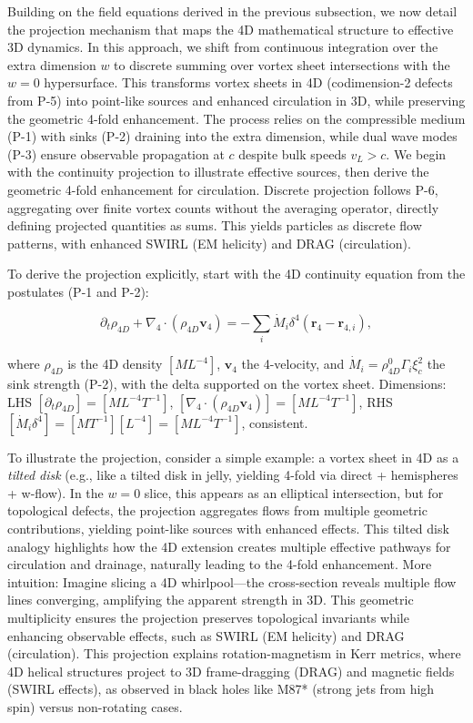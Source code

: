 Building on the field equations derived in the previous subsection, we now detail the projection mechanism that maps the 4D mathematical structure to effective 3D dynamics. In this approach, we shift from continuous integration over the extra dimension $w$ to discrete summing over vortex sheet intersections with the $w=0$ hypersurface. This transforms vortex sheets in 4D (codimension-2 defects from P-5) into point-like sources and enhanced circulation in 3D, while preserving the geometric 4-fold enhancement. The process relies on the compressible medium (P-1) with sinks (P-2) draining into the extra dimension, while dual wave modes (P-3) ensure observable propagation at $c$ despite bulk speeds $v_L > c$. We begin with the continuity projection to illustrate effective sources, then derive the geometric 4-fold enhancement for circulation. Discrete projection follows P-6, aggregating over finite vortex counts without the averaging operator, directly defining projected quantities as sums. This yields particles as discrete flow patterns, with enhanced SWIRL (EM helicity) and DRAG (circulation).

To derive the projection explicitly, start with the 4D continuity equation from the postulates (P-1 and P-2):

\begin{equation}
\partial_t \rho_{4D} + \nabla_4 \cdot (\rho_{4D} \mathbf{v}_4) = -\sum_i \dot{M}_i \delta^4(\mathbf{r}_4 - \mathbf{r}_{4,i}),
\end{equation}

where $\rho_{4D}$ is the 4D density $[M L^{-4}]$, $\mathbf{v}_4$ the 4-velocity, and $\dot{M}_i = \rho_{4D}^0 \Gamma_i \xi_c^2$ the sink strength (P-2), with the delta supported on the vortex sheet. Dimensions: LHS $[\partial_t \rho_{4D}] = [M L^{-4} T^{-1}]$, $[\nabla_4 \cdot (\rho_{4D} \mathbf{v}_4)] = [M L^{-4} T^{-1}]$, RHS $[\dot{M}_i \delta^4] = [M T^{-1}] [L^{-4}] = [M L^{-4} T^{-1}]$, consistent.

To illustrate the projection, consider a simple example: a vortex sheet in 4D as a \emph{tilted disk} (e.g., like a tilted disk in jelly, yielding 4-fold via direct + hemispheres + w-flow). In the $w=0$ slice, this appears as an elliptical intersection, but for topological defects, the projection aggregates flows from multiple geometric contributions, yielding point-like sources with enhanced effects. This tilted disk analogy highlights how the 4D extension creates multiple effective pathways for circulation and drainage, naturally leading to the 4-fold enhancement. More intuition: Imagine slicing a 4D whirlpool---the cross-section reveals multiple flow lines converging, amplifying the apparent strength in 3D. This geometric multiplicity ensures the projection preserves topological invariants while enhancing observable effects, such as SWIRL (EM helicity) and DRAG (circulation). This projection explains rotation-magnetism in Kerr metrics, where 4D helical structures project to 3D frame-dragging (DRAG) and magnetic fields (SWIRL effects), as observed in black holes like M87* (strong jets from high spin) versus non-rotating cases.

